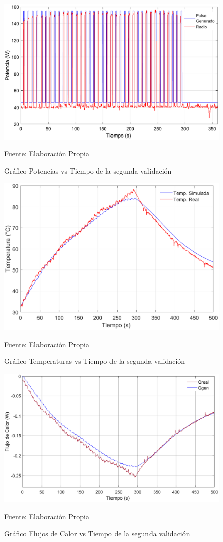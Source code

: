 \begin{figure}[H]
\centering
\includegraphics[scale=0.6]{Figuras/Validacion_2_P.eps}
\caption{Gráfico Potencias vs Tiempo de la segunda validación}
Fuente: Elaboración Propia
\label{validacion_2_P}
\end{figure}

\begin{figure}[H]
\centering
\includegraphics[scale=0.66]{Figuras/Validacion_2_T.eps}
\caption{Gráfico Temperaturas vs Tiempo de la segunda validación}
Fuente: Elaboración Propia
\label{validacion_2_T}
\end{figure}

\begin{figure}[H]
\centering
\includegraphics[scale=0.63]{Figuras/Validacion_2_Q.eps}
\caption{Gráfico Flujos de Calor vs Tiempo de la segunda validación}
Fuente: Elaboración Propia
\label{validacion_2_Q}
\end{figure}